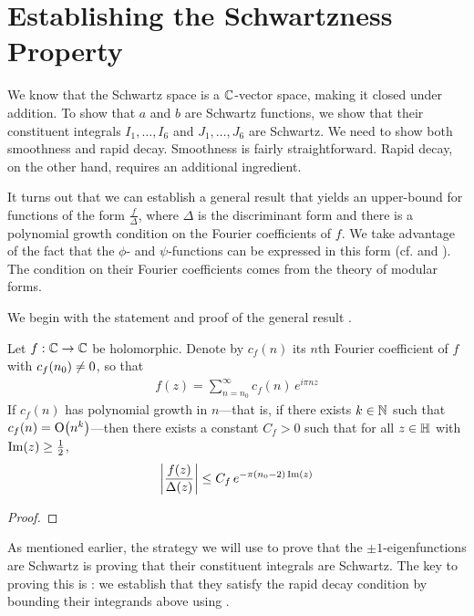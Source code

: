 \section{Establishing the Schwartzness Property}

We know that the Schwartz space is a $\mathbb{C}$-vector space, making it closed under addition. To show that $a$ and $b$ are Schwartz functions, we show that their constituent integrals $I_1, \ldots, I_6$ and $J_1, \ldots, J_6$ are Schwartz. We need to show both smoothness and rapid decay. Smoothness is fairly straightforward. Rapid decay, on the other hand, requires an additional ingredient.

It turns out that we can establish a general result that yields an upper-bound for functions of the form $\frac{f}{\Delta}$, where $\Delta$ is the discriminant form and there is a polynomial growth condition on the Fourier coefficients of $f$. We take advantage of the fact that the $\phi$- and $\psi$-functions can be expressed in this form (cf.  and ). The condition on their Fourier coefficients comes from the theory of modular forms.

We begin with the statement and proof of the general result \cite[Lemma 7.4]{blueprint}.

\begin{boxtheorem}\label{SP:PolyFourierCoeffBound}
    Let $f : \mathbb{C} \to \mathbb{C}$ be holomorphic. Denote by $c_f(n)$ its $n$th Fourier coefficient of $f$ with $c_f\!\left( n_0 \right) \neq 0$, so that
    \begin{align*}
        f(z) = \sum_{n=n_0}^{\infty} c_f(n) \, e^{i \pi n z}
    \end{align*}
    If $c_f(n)$ has polynomial growth in $n$---that is, if there exists $k \in \mathbb{N}$ such that $c_f(n) = \operatorname{O}\!\left( n^k \right)$---then there exists a constant $C_f > 0$ such that for all $z \in \mathbb{H}$ with $\operatorname{Im}\!\left( z \right) \geq \frac{1}{2}$,
    \begin{align*}
        \left\lvert \frac{f(z)}{\Delta(z)} \right\rvert \leq C_f \, e^{-\pi \left( n_0 - 2 \right) \operatorname{Im}(z)}
    \end{align*}
\end{boxtheorem}
\begin{proof}
    
\end{proof}

As mentioned earlier, the strategy we will use to prove that the $\pm 1$-eigenfunctions are Schwartz is proving that their constituent integrals are Schwartz. The key to proving this is : we establish that they satisfy the rapid decay condition by bounding their integrands above using .

